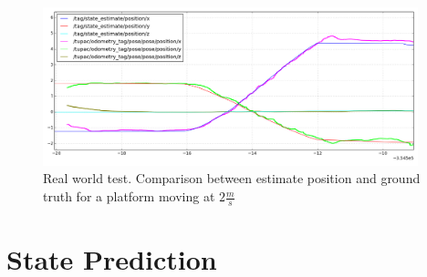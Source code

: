 \begin{figure}[!ht]
    \centering
    \includegraphics[width=0.97\textwidth]{img/position_real_world_fast.png}
      \caption{Real world test. Comparison between estimate position and ground truth for a platform moving at $2\frac{m}{s}$}
    \label{fig:ekf_position_real_fast}
\end{figure}

\section{State Prediction}
